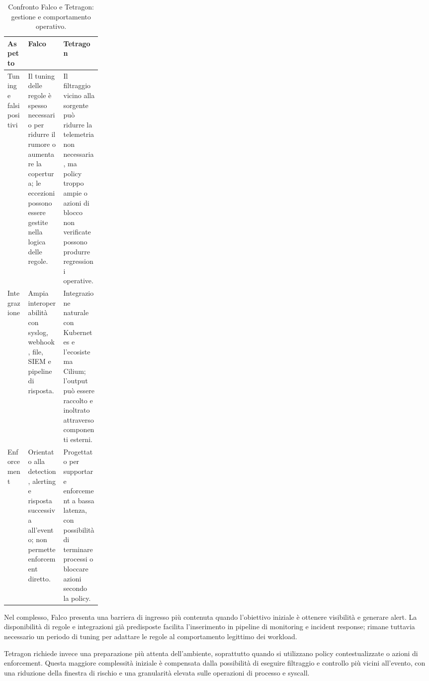 \documentclass[12pt,a4paper,openright,twoside]{book}
\begin{document}
\begin{table}[htbp]
    \centering
    \caption{Confronto Falco e Tetragon: gestione e comportamento operativo.}
    \label{tab:configuration-comparison-operation}
    \small
    \renewcommand{\arraystretch}{1.25}
    \begin{tabularx}{\linewidth}{>{\raggedright\arraybackslash}p{0.22\linewidth} >{\raggedright\arraybackslash}X >{\raggedright\arraybackslash}X}
        \hline
        \textbf{Aspetto} & \textbf{Falco} & \textbf{Tetragon} \\
        \hline
        Tuning e falsi positivi & Il tuning delle regole è spesso necessario per ridurre il rumore o aumentare la copertura; le eccezioni possono essere gestite nella logica delle regole. & Il filtraggio vicino alla sorgente può ridurre la telemetria non necessaria, ma policy troppo ampie o azioni di blocco non verificate possono produrre regressioni operative. \\
        \hline
        Integrazione & Ampia interoperabilità con syslog, webhook, file, SIEM e pipeline di risposta. & Integrazione naturale con Kubernetes e l'ecosistema Cilium; l'output può essere raccolto e inoltrato attraverso componenti esterni. \\
        \hline
        Enforcement & Orientato alla detection, alerting e risposta successiva all'evento; non permette enforcement diretto. & Progettato per supportare enforcement a bassa latenza, con possibilità di terminare processi o bloccare azioni secondo la policy. \\
        \hline
    \end{tabularx}
\end{table}

\FloatBarrier

Nel complesso, Falco presenta una barriera di ingresso più contenuta quando l'obiettivo iniziale è ottenere visibilità e generare alert. La disponibilità di regole e integrazioni già predisposte facilita l'inserimento in pipeline di monitoring e incident response; rimane tuttavia necessario un periodo di tuning per adattare le regole al comportamento legittimo dei workload.

Tetragon richiede invece una preparazione più attenta dell'ambiente, soprattutto quando si utilizzano policy contestualizzate o azioni di enforcement. Questa maggiore complessità iniziale è compensata dalla possibilità di eseguire filtraggio e controllo più vicini all'evento, con una riduzione della finestra di rischio e una granularità elevata sulle operazioni di processo e syscall.
\end{document}
